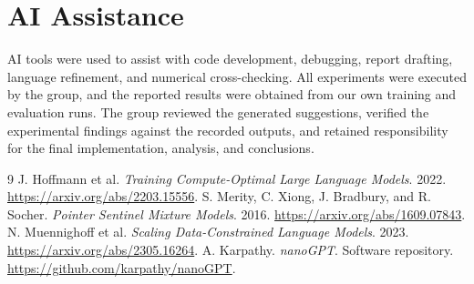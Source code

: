 \documentclass[11pt]{article}
\begin{document}
\section*{AI Assistance}

\noindent
AI tools were used to assist with code development, debugging, report drafting, language refinement, and numerical cross-checking. All experiments were executed by the group, and the reported results were obtained from our own training and evaluation runs. The group reviewed the generated suggestions, verified the experimental findings against the recorded outputs, and retained responsibility for the final implementation, analysis, and conclusions.

\begin{thebibliography}{9}
 J. Hoffmann et al. \emph{Training Compute-Optimal Large Language Models}. 2022. \url{https://arxiv.org/abs/2203.15556}.
 S. Merity, C. Xiong, J. Bradbury, and R. Socher. \emph{Pointer Sentinel Mixture Models}. 2016. \url{https://arxiv.org/abs/1609.07843}.
 N. Muennighoff et al. \emph{Scaling Data-Constrained Language Models}. 2023. \url{https://arxiv.org/abs/2305.16264}.
 A. Karpathy. \emph{nanoGPT}. Software repository. \url{https://github.com/karpathy/nanoGPT}.
\end{thebibliography}
\end{document}
